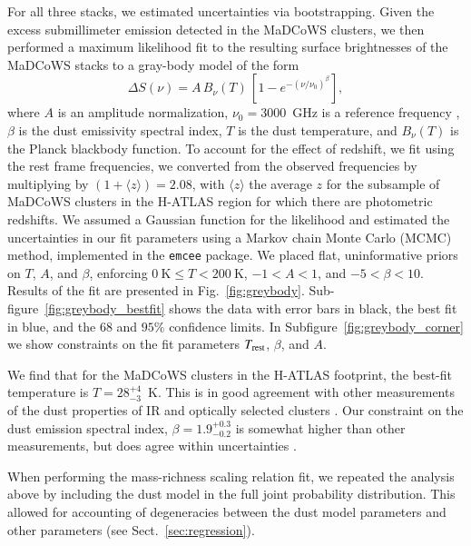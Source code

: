 \documentclass[longauth]{aa} %
\newcommand{\madcows}{MaDCoWS\xspace}
\begin{document}
For all three stacks, we estimated uncertainties via bootstrapping. Given the excess submillimeter emission detected in the \madcows clusters, we then performed a maximum likelihood fit to the resulting surface brightnesses of the \madcows stacks to a gray-body model of the form
\begin{equation}
    \label{eq:4}    
    \Delta S(\nu) = A \, B_{\nu}(T) \, \left[ 1 - e^{-(\nu / \nu_0)^{\beta}} \right],
\end{equation}
where $A$ is an amplitude normalization, $\nu_0 = 3000$~GHz is a reference frequency \citep{Draine2006}, $\beta$ is the dust emissivity spectral index, $T$ is the dust temperature, and $B_{\nu}(T)$ is the Planck blackbody function. To account for the effect of redshift, we fit using the rest frame frequencies,  we converted from the observed frequencies by multiplying by $(1+\langle z \rangle)=2.08$, with $\langle z \rangle$ the average $z$ for the subsample of MaDCoWS clusters in the H-ATLAS region for which there are photometric redshifts. We assumed a Gaussian function for the likelihood and estimated the uncertainties in our fit parameters using a Markov chain Monte Carlo (MCMC) method, implemented in the \texttt{emcee} \citep{MacKey2013} package. We placed flat, uninformative priors on $T$, $A$, and $\beta$, enforcing $0~\text{K} \leq T < 200~\text{K}$,  $-1 < A < 1$, and $-5 < \beta < 10$. Results of the fit are presented in Fig.~\ref{fig:greybody}. 
Sub-figure~\ref{fig:greybody_bestfit} shows the data with error bars in black, the best fit in blue, and the $68$ and $95\%$ confidence limits. In Subfigure~\ref{fig:greybody_corner} we show constraints on the fit parameters $T_{\rm rest}$,  $\beta$, and $A$.

We find that for the \madcows clusters in the H-ATLAS footprint, the best-fit temperature is $T = 28^{+4}_{-3}$~K. This is in good agreement with other measurements of the dust properties of IR and optically selected clusters \citep[see, e.g.,][]{Smith2013, Erler2018, Amodeo2021, Fuzia2021,Vavagiakis2021}. Our constraint on the dust emission spectral index, $\beta = 1.9^{+0.3}_{-0.2}$ is somewhat higher than other measurements, but does agree within uncertainties \citep[see, e.g.,][]{Magnelli2012,Smith2013,Sayers2019}.

When performing the mass-richness scaling relation fit, we repeated the analysis above by including the dust model in the full joint probability distribution. This allowed for accounting of degeneracies between the dust model parameters and other parameters (see Sect.~\ref{sec:regression}).\\
\end{document}
